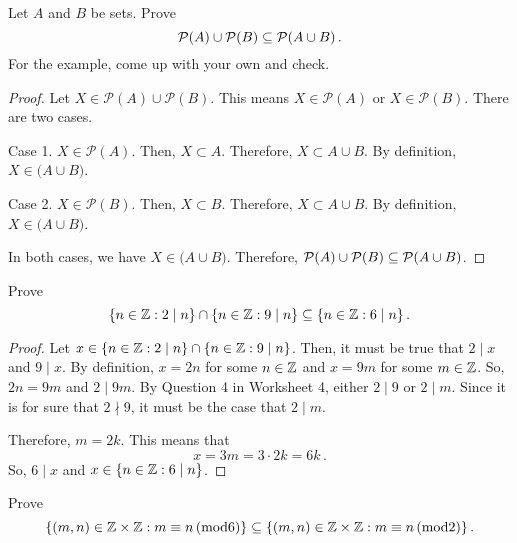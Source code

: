 \documentclass[12pt]{amsart}
\begin{document}
\begin{problem}[Exercise 3.15]
Let $A$ and $B$ be sets. Prove
\begin{equation*}
	\mathcal{P}(A) \cup \mathcal{P}(B) \subseteq \mathcal{P}(A \cup B) \,.
\end{equation*}
For the example, come up with your own and check.
\end{problem}

\begin{proof}
	Let $X \in \mathcal{P}(A) \cup \mathcal{P}(B)$.
	This means $X \in \mathcal{P}(A)$ or $X \in \mathcal{P}(B)$.
	There are two cases.

	Case 1. $X \in \mathcal{P}(A)$. Then, $X \subset A$.
	Therefore, $X \subset A \cup B$.
	By definition, $X \in \mathcal(A \cup B)$.

	Case 2. $X \in \mathcal{P}(B)$. Then, $X \subset B$.
	Therefore, $X \subset A \cup B$.
	By definition, $X \in \mathcal(A \cup B)$.

	In both cases, we have $X \in \mathcal(A \cup B)$.
	Therefore,
	$ \mathcal{P}(A) \cup \mathcal{P}(B) \subseteq \mathcal{P}(A \cup B)$.
\end{proof}

\begin{problem}[Exercise 3.21]
Prove
\begin{equation*}
	\{ n\in \mathbb{Z} : 2 \mid n \} \cap \{ n \in \mathbb{Z}: 9 \mid n\}
	\subseteq
	\{ n \in \mathbb{Z}: 6 \mid n \} \,.
\end{equation*}
\end{problem}

\begin{proof}
	Let $x \in  \{ n\in \mathbb{Z} : 2 \mid n \} \cap \{ n \in \mathbb{Z}: 9 \mid n\} $.
	Then, it must be true that $2 \mid x$ and $9 \mid x$.
	By definition, $x = 2n$ for some $n\in \mathbb{Z}$ and $x = 9m$ for
	some $m \in \mathbb{Z}$.
	So, $2n = 9m$ and $2 \mid 9m$.
	By Question 4 in Worksheet 4, either $2 \mid 9$ or $2 \mid m$.
	Since it is for sure that $2 \nmid 9$, it must be the case that
	$2\mid m$.

	Therefore, $m = 2k$.
	This means that
	\begin{equation*}
		x = 3m = 3\cdot 2k = 6k \,.
	\end{equation*}
	So, $6 \mid x$ and $x \in  \{ n \in \mathbb{Z}: 6 \mid n \}$.
\end{proof}

\begin{problem}[Exercise 3.22]
Prove
\begin{equation*}
	\{ (m,n) \in \mathbb{Z} \times \mathbb{Z}: m \equiv n \, (\mathrm{mod} 6) \}
	\subseteq
	\{ (m,n) \in \mathbb{Z} \times \mathbb{Z}: m \equiv n \, (\mathrm{mod} 2) \} \,.
\end{equation*}
\end{problem}
\end{document}
